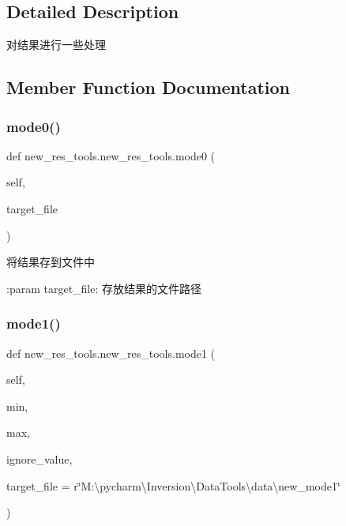 \subsection{Detailed Description}
\begin{DoxyVerb}对结果进行一些处理\end{DoxyVerb}
 

\subsection{Member Function Documentation}
\mbox{\label{classnew__res__tools_1_1new__res__tools_aa088ef1d63848aec177552b6e94ebbbf}} 
\subsubsection{\texorpdfstring{mode0()}{mode0()}}
{\footnotesize\ttfamily def new\+\_\+res\+\_\+tools.\+new\+\_\+res\+\_\+tools.\+mode0 (\begin{DoxyParamCaption}\item[{}]{self,  }\item[{}]{target\+\_\+file }\end{DoxyParamCaption})}

\begin{DoxyVerb}将结果存到文件中

:param target_file: 存放结果的文件路径
\end{DoxyVerb}
 \mbox{\label{classnew__res__tools_1_1new__res__tools_a58bd123c2c81266295228e3f31fc5703}} 
\subsubsection{\texorpdfstring{mode1()}{mode1()}}
{\footnotesize\ttfamily def new\+\_\+res\+\_\+tools.\+new\+\_\+res\+\_\+tools.\+mode1 (\begin{DoxyParamCaption}\item[{}]{self,  }\item[{}]{min,  }\item[{}]{max,  }\item[{}]{ignore\+\_\+value,  }\item[{}]{target\+\_\+file = {\ttfamily r\char`\"{}M\+:\textbackslash{}pycharm\textbackslash{}Inversion\textbackslash{}DataTools\textbackslash{}data\textbackslash{}new\+\_\+mode1\char`\"{}} }\end{DoxyParamCaption})}

